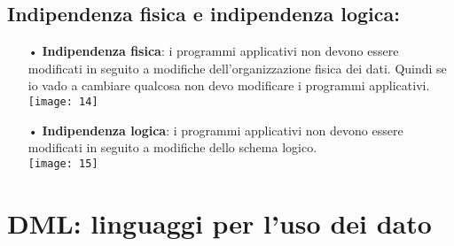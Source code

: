 \documentclass[12pt, letterpaper]{article}
\begin{document}
\subsection{\textbf{Indipendenza fisica e indipendenza logica:\\}}
\begin{itemize}
   \item[•] \textbf{Indipendenza fisica}: i programmi applicativi non devono essere modificati in
      seguito a modifiche dell’organizzazione fisica dei dati. Quindi se io vado a cambiare qualcosa non devo modificare i programmi applicativi. \\
      \texttt{[image: 14]}
   \item[•] \textbf{Indipendenza logica}: i programmi applicativi non devono essere modificati in
      seguito a modifiche dello schema logico. \\
      \texttt{[image: 15]}
\end{itemize}

\section{DML: linguaggi per l'uso dei dato}
\end{document}
